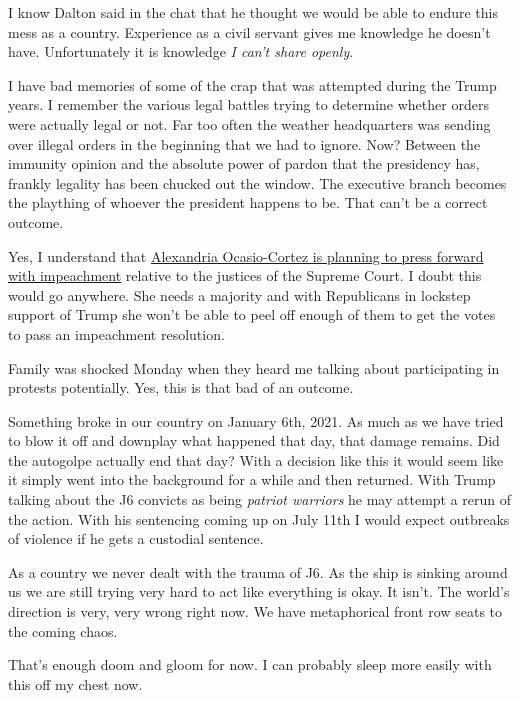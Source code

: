 I know Dalton said in the chat that he thought we would be able to
endure this mess as a country. Experience as a civil servant gives me
knowledge he doesn't have. Unfortunately it is knowledge \emph{I can't
share openly}.

I have bad memories of some of the crap that was attempted during the
Trump years. I remember the various legal battles trying to determine
whether orders were actually legal or not. Far too often the weather
headquarters was sending over illegal orders in the beginning that we
had to ignore. Now? Between the immunity opinion and the absolute power
of pardon that the presidency has, frankly legality has been chucked out
the window. The executive branch becomes the plaything of whoever the
president happens to be. That can't be a correct outcome.

Yes, I understand that
\href{https://news.yahoo.com/news/aoc-says-shell-file-articles-190630498.html}{Alexandria
Ocasio-Cortez is planning to press forward with impeachment} relative to
the justices of the Supreme Court. I doubt this would go anywhere. She
needs a majority and with Republicans in lockstep support of Trump she
won't be able to peel off enough of them to get the votes to pass an
impeachment resolution.

Family was shocked Monday when they heard me talking about participating
in protests potentially. Yes, this is that bad of an outcome.

Something broke in our country on January 6th, 2021. As much as we have
tried to blow it off and downplay what happened that day, that damage
remains. Did the autogolpe actually end that day? With a decision like
this it would seem like it simply went into the background for a while
and then returned. With Trump talking about the J6 convicts as being
\emph{patriot warriors} he may attempt a rerun of the action. With his
sentencing coming up on July 11th I would expect outbreaks of violence
if he gets a custodial sentence.

As a country we never dealt with the trauma of J6. As the ship is
sinking around us we are still trying very hard to act like everything
is okay. It isn't. The world's direction is very, very wrong right now.
We have metaphorical front row seats to the coming chaos.

That's enough doom and gloom for now. I can probably sleep more easily
with this off my chest now.
